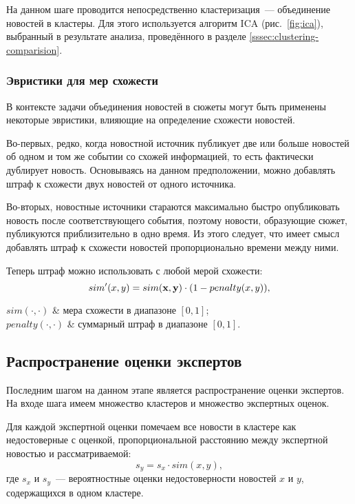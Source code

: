 На данном шаге проводится непосредственно кластеризация~--- объединение новостей в кластеры. Для этого используется алгоритм ICA (рис.~\ref{fig:ica}), выбранный в результате анализа, проведённого в разделе \ref{sssec:clustering-comparision}.

\subsubsection{Эвристики для мер схожести}
В контексте задачи объединения новостей в сюжеты могут быть применены некоторые эвристики, влияющие на определение схожести новостей.

Во-первых, редко, когда новостной источник публикует две или больше новостей об одном и том же событии со схожей информацией, то есть фактически дублирует новость. Основываясь на данном предположении, можно добавлять штраф к схожести двух новостей от одного источника.

Во-вторых, новостные источники стараются максимально быстро опубликовать новость после соответствующего события, поэтому новости, образующие сюжет, публикуются приблизительно в одно время. Из этого следует, что имеет смысл добавлять штраф к схожести новостей пропорционально времени между ними.

Теперь штраф можно использовать с любой мерой схожести:
\begin{equation}
    sim'(x,y)=sim(\boldsymbol{\mathbf{x}},\boldsymbol{\mathbf{y}})\cdot(1-penalty(x,y)),
\end{equation}
\begin{conditions}
    $sim(\cdot,\cdot)$ & мера схожести в диапазоне $[0,1]$; \\
    $penalty(\cdot,\cdot)$ & суммарный штраф в диапазоне $[0,1]$. \\
\end{conditions}

\subsection{Распространение оценки экспертов}
Последним шагом на данном этапе является распространение оценки экспертов. На входе шага имеем множество кластеров и множество экспертных оценок.

Для каждой экспертной оценки помечаем все новости в кластере как недостоверные с оценкой, пропорциональной расстоянию между экспертной новостью и рассматриваемой:
\begin{equation}
    s_y=s_x\cdot sim(x,y),
\end{equation}
где $s_x$ и $s_y$~--- вероятностные оценки недостоверности новостей $x$ и $y$, содержащихся в одном кластере.

